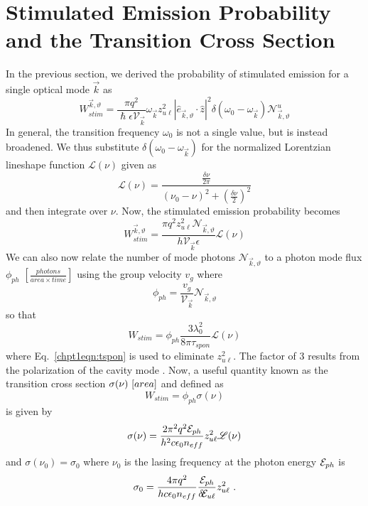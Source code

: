 \documentclass[12pt]{report}
\begin{document}
{\section{Stimulated Emission Probability and the Transition Cross Section}
In the previous section, we derived the probability of stimulated emission for a single optical mode $\vec{k}$ as
\begin{equation}
W_{stim}^{\vec{k},\vartheta} = \frac{\pi q^2}{\hslash \epsilon \mathcal{V}_{\vec{k}}} \omega_{\vec{k}}
z_{u\ell}^2
|\hat{e}_{\vec{k},\vartheta} \cdot \hat{z} |^2  \delta(\omega_0-\omega_{\vec{k}}) \mathcal{N}_{\vec{k},\vartheta}^u
\end{equation}
In general, the transition frequency $\omega_0$ is not a single value, but is instead broadened.  We thus substitute $\delta(\omega_0-\omega_{\vec{k}})$ for the normalized Lorentzian lineshape function $\mathscr{L}(\nu)$ given as
\begin{equation}
\mathscr{L}(\nu)=\frac{\frac{\delta\!\nu}{2\pi}}{(\nu_0-\nu)^2+\left(\frac{\delta\!\nu}{2} \right)^2} %
\end{equation}
and then integrate over $\nu$.  Now, the stimulated emission probability becomes \cite{Yariv:book:1989}
\begin{equation}
W_{stim}^{\vec{k},\vartheta}=\frac{\pi q^2 z_{u\ell}^2 \mathcal{N}_{\vec{k},\vartheta}}{h \mathcal{V}_{\vec{k}} \epsilon} \mathscr{L}(\nu)
\end{equation}
We can also now relate the number of mode photons $\mathcal{N}_{\vec{k},\vartheta}$ to a photon mode flux $\phi_{ph}$ $[\frac{{photons}}{{area}\times{time}}]$ using the group velocity $v_g$ where
\begin{equation}
\phi_{ph} = \frac{v_g}{\mathcal{V}_{\vec{k}}} \mathcal{N}_{\vec{k},\vartheta}
\end{equation}
so that \cite{Yariv:book:1989}
\begin{equation}
W_{stim} = \phi_{ph} \frac{3 \lambda_0^2}{8 \pi \tau_{spon}} \mathscr{L}(\nu)
\end{equation}
where Eq.~\eqref{chpt1eqn:tspon} is used to eliminate $z_{u\ell}^2$.  The factor of 3 results from the polarization of the cavity mode \cite{Siegman:book:1986}.  Now, a useful quantity known as the transition cross section $\sigma(\nu)~[\small{{area}}]$ and defined as \cite{SalehTeich:book:1991}
\begin{equation}
W_{stim}=\phi_{ph} \sigma(\nu)
\end{equation}
is given by
\begin{equation}
\sigma(\nu) = \frac{2 \pi^2 q^2 \EE_{ph}}{h^2 c \epsilon_0 n_{eff}} z_{u\ell}^2 \mathscr{L}(\nu)
\end{equation}
and $\sigma(\nu_0)=\sigma_0$ where $\nu_0$ is the lasing frequency at the photon energy $\EE_{ph}$ is
\begin{equation}
\label{chpt1eqn:transition_crosssection}
\sigma_0 = \frac{4 \pi q^2}{h c \epsilon_0 n_{eff}} \frac{\EE_{ph}}{\delta\!\EE_{u\ell}} z_{u\ell}^2 {~.}
\end{equation}

}
\end{document}
